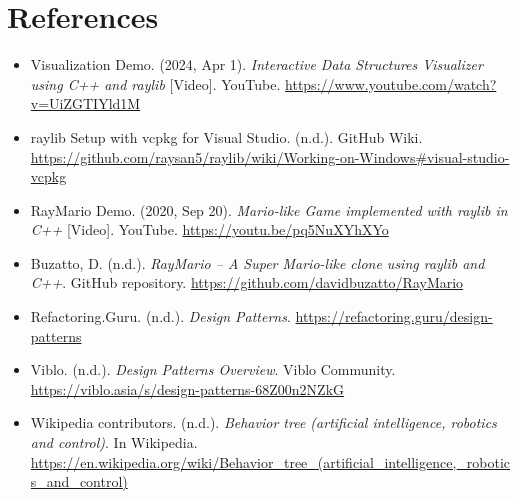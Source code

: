 \clearpage
\section*{References}

\begin{itemize}
  \item Visualization Demo. (2024, Apr 1). \textit{Interactive Data Structures Visualizer using C++ and raylib} [Video]. YouTube. \url{https://www.youtube.com/watch?v=UiZGTIYld1M}
  \item raylib Setup with vcpkg for Visual Studio. (n.d.). GitHub Wiki. \url{https://github.com/raysan5/raylib/wiki/Working-on-Windows#visual-studio-vcpkg}
  \item RayMario Demo. (2020, Sep 20). \textit{Mario-like Game implemented with raylib in C++} [Video]. YouTube. \url{https://youtu.be/pq5NuXYhXYo}
  \item Buzatto, D. (n.d.). \textit{RayMario – A Super Mario-like clone using raylib and C++}. GitHub repository. \url{https://github.com/davidbuzatto/RayMario}
  \item Refactoring.Guru. (n.d.). \textit{Design Patterns}. \url{https://refactoring.guru/design-patterns}
  \item Viblo. (n.d.). \textit{Design Patterns Overview}. Viblo Community. \url{https://viblo.asia/s/design-patterns-68Z00n2NZkG}
  \item Wikipedia contributors. (n.d.). \textit{Behavior tree (artificial intelligence, robotics and control)}. In Wikipedia. \url{https://en.wikipedia.org/wiki/Behavior_tree_(artificial_intelligence,_robotics_and_control)}
\end{itemize}
